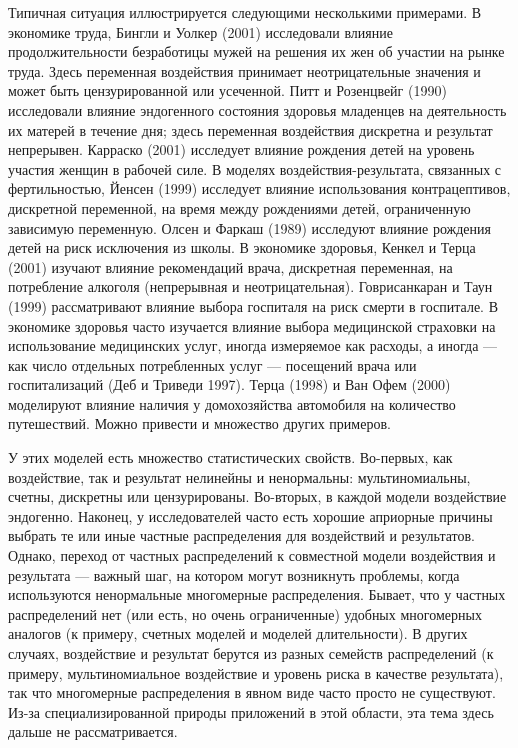 Типичная ситуация иллюстрируется следующими несколькими примерами. В экономике труда, Бингли и Уолкер (2001) исследовали влияние продолжительности безработицы мужей на решения их жен об участии на рынке труда. Здесь переменная воздействия принимает неотрицательные значения и может быть цензурированной или усеченной. Питт и Розенцвейг (1990) исследовали влияние эндогенного состояния здоровья младенцев на деятельность их матерей в течение дня; здесь переменная воздействия дискретна и результат непрерывен. Карраско (2001) исследует влияние рождения детей на уровень участия женщин в рабочей силе. В моделях воздействия-результата, связанных с фертильностью, Йенсен (1999) исследует влияние использования контрацептивов, дискретной переменной, на время между рождениями детей, ограниченную зависимую переменную. Олсен и Фаркаш (1989) исследуют влияние рождения детей на риск исключения из школы. В экономике здоровья, Кенкел и Терца (2001) изучают влияние рекомендаций врача, дискретная переменная, на потребление алкоголя (непрерывная и неотрицательная). Говрисанкаран и Таун (1999) рассматривают влияние выбора госпиталя на риск смерти в госпитале. В экономике здоровья часто изучается влияние выбора медицинской страховки  на использование медицинских услуг, иногда измеряемое как расходы, а иногда --- как число отдельных потребленных услуг --- посещений врача или госпитализаций (Деб и Триведи 1997). Терца (1998) и Ван Офем (2000) моделируют влияние наличия у домохозяйства автомобиля на количество путешествий. Можно привести и множество других примеров. 

У этих моделей есть множество статистических свойств. Во-первых, как воздействие, так и результат нелинейны и ненормальны: мультиномиальны, счетны, дискретны или цензурированы. Во-вторых, в каждой модели воздействие эндогенно. Наконец, у исследователей часто есть хорошие априорные причины выбрать те или иные частные распределения для воздействий и результатов. Однако, переход от частных распределений к совместной модели воздействия и результата --- важный шаг, на котором могут возникнуть проблемы, когда используются ненормальные многомерные распределения. Бывает, что у частных распределений нет (или есть, но очень ограниченные) удобных многомерных аналогов (к примеру, счетных моделей и моделей длительности). В других случаях, воздействие и результат берутся из разных семейств распределений (к примеру, мультиномиальное воздействие и уровень риска в качестве результата), так что  многомерные распределения в явном виде часто просто не существуют. Из-за специализированной природы приложений в этой области, эта тема здесь дальше не рассматривается. 

